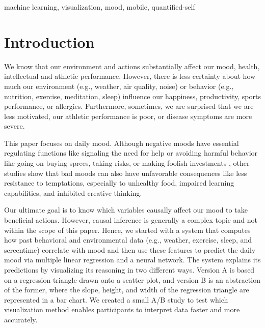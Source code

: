 \documentclass[conference]{IEEEtran}
\begin{document}
\begin{IEEEkeywords}
machine learning, visualization, mood, mobile, quantified-self
\end{IEEEkeywords}

\section{Introduction}
We know that our environment and actions substantially affect our mood, health, intellectual and athletic performance.
However, there is less certainty about how much our environment (e.g., weather, air quality, noise) or behavior (e.g., nutrition, exercise, meditation, sleep) influence our happiness, productivity, sports performance, or allergies.
Furthermore, sometimes, we are surprised that we are less motivated, our athletic performance is poor, or disease symptoms are more severe.

This paper focuses on daily mood. Although negative moods have essential regulating functions like signaling the need for help or avoiding harmful behavior like going on buying sprees, taking risks, or making foolish investments \cite{noauthor_bipolar_nodate}, other studies show that bad moods can also have unfavorable consequences like less resistance to temptations, especially to unhealthy food\cite{fedorikhin_positive_2010}, impaired learning capabilities\cite{brand_how_2007}, and inhibited creative thinking\cite{vosburg_effects_1998}.

Our ultimate goal is to know which variables causally affect our mood to take beneficial actions. However, causal inference is generally a complex topic and not within the scope of this paper. Hence, we started with a system that computes how past behavioral and environmental data (e.g., weather, exercise, sleep, and screentime) correlate with mood and then use these features to predict the daily mood via multiple linear regression and a neural network. 
The system explains its predictions by visualizing its reasoning in two different ways. Version A is based on a regression triangle drawn onto a scatter plot, and version B is an abstraction of the former, where the slope, height, and width of the regression triangle are represented in a bar chart. We created a small A/B study to test which visualization method enables participants to interpret data faster and more accurately.


\end{document}
